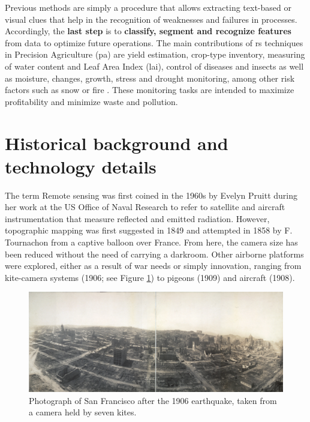 Previous methods are simply a procedure that allows extracting text-based or visual clues that help in the recognition of weaknesses and failures in processes. Accordingly, the \textbf{last step} is to \textbf{classify, segment and recognize features} from data to optimize future operations. The main contributions of \acrshort{rs} techniques in Precision Agriculture (\acrshort{pa}) are yield estimation, crop-type inventory, measuring of water content and Leaf Area Index (\acrshort{lai}), control of diseases and insects as well as moisture, changes, growth, stress and drought monitoring, among other risk factors such as snow or fire \cite{huang_agricultural_2018}. These monitoring tasks are intended to maximize profitability and minimize waste and pollution. 

\section{Historical background and technology details}

The term Remote sensing was first coined in the 1960s by Evelyn Pruitt during her work at the US Office of Naval Research to refer to satellite and aircraft instrumentation that measure reflected and emitted radiation. However, topographic mapping was first suggested in 1849 and attempted in 1858 by F. Tournachon from a captive balloon over France. From here, the camera size has been reduced without the need of carrying a darkroom. Other airborne platforms were explored, either as a result of war needs or simply innovation, ranging from kite-camera systems (1906; see Figure \ref{fig:san_francisco_kite}) to pigeons (1909) and aircraft (1908).

\begin{figure}[!ht]
	\includegraphics{figs/introduction/san_francisco_kitecamera.jpg}
	\caption{Photograph of San Francisco after the 1906 earthquake, taken from a camera held by seven kites. }
    \label{fig:san_francisco_kite}
\end{figure}

